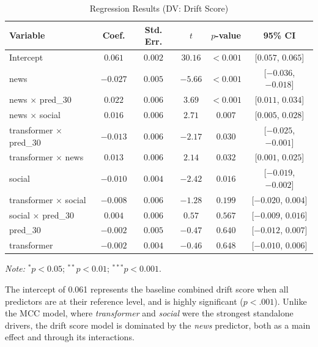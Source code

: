 \documentclass[stu,floatsintext]{apa7}
\begin{document}
\begin{table}[htbp]
\centering
\caption{Regression Results (DV: Drift Score)}
\label{tab:drift_results}
\begin{tabular}{lccccc}
\toprule
Variable & Coef. & Std. Err. & $t$ & $p$-value & 95\% CI \\
\midrule
Intercept                  & $0.061$  & $0.002$ & $30.16$ & $<0.001$\rlap{$^{***}$} & [$0.057$, $0.065$] \\
news                       & $-0.027$ & $0.005$ & $-5.66$ & $<0.001$\rlap{$^{***}$} & [$-0.036$, $-0.018$] \\
news $\times$ pred\_30     & $0.022$  & $0.006$ & $3.69$  & $<0.001$\rlap{$^{***}$} & [$0.011$, $0.034$] \\
news $\times$ social       & $0.016$  & $0.006$ & $2.71$  & $0.007$\rlap{$^{**}$}  & [$0.005$, $0.028$] \\
transformer $\times$ pred\_30 & $-0.013$ & $0.006$ & $-2.17$ & $0.030$\rlap{$^{*}$}   & [$-0.025$, $-0.001$] \\
transformer $\times$ news  & $0.013$  & $0.006$ & $2.14$  & $0.032$\rlap{$^{*}$}   & [$0.001$, $0.025$] \\
social                     & $-0.010$ & $0.004$ & $-2.42$ & $0.016$\rlap{$^{*}$}   & [$-0.019$, $-0.002$] \\
transformer $\times$ social & $-0.008$ & $0.006$ & $-1.28$ & $0.199$                & [$-0.020$, $0.004$] \\
social $\times$ pred\_30   & $0.004$  & $0.006$ & $0.57$  & $0.567$                & [$-0.009$, $0.016$] \\
pred\_30                   & $-0.002$ & $0.005$ & $-0.47$ & $0.640$                & [$-0.012$, $0.007$] \\
transformer                & $-0.002$ & $0.004$ & $-0.46$ & $0.648$                & [$-0.010$, $0.006$] \\
\bottomrule
\end{tabular}
\begin{flushleft}
\footnotesize
\textit{Note:} $^{*}p<0.05$; $^{**}p<0.01$; $^{***}p<0.001$.
\end{flushleft}
\end{table}

The intercept of 0.061 represents the baseline combined drift score when all predictors are at their reference level, and is highly significant ($p < .001$). Unlike the MCC model, where \textit{transformer} and \textit{social} were the strongest standalone drivers, the drift score model is dominated by the \textit{news} predictor, both as a main effect and through its interactions.
\end{document}
